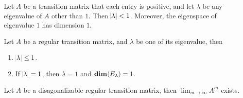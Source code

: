 \begin{theorem}
    Let $A$ be a transition matrix that each entry is positive, and let $\lambda$ be any eigenvalue of $A$ other than $1$. Then $\abs{\lambda} < 1$. Moreover, the eigenspace of eigenvalue $1$ has dimension $1$.
\end{theorem}

\begin{theorem}
    Let $A$ be a regular transition matrix, and $\lambda$ be one of its eigenvalue, then
    \begin{enumerate}
        \item $\abs{\lambda} \leq 1$.
        \item If $\abs{\lambda} = 1$, then $\lambda = 1$ and $\dimension{E_\lambda} = 1$.
    \end{enumerate}    
\end{theorem}

\begin{theorem}
    Let $A$ be a disagonalizable regular transition matrix, then $\displaystyle \lim_{m \rightarrow \infty} A^m$ exists.
\end{theorem}

